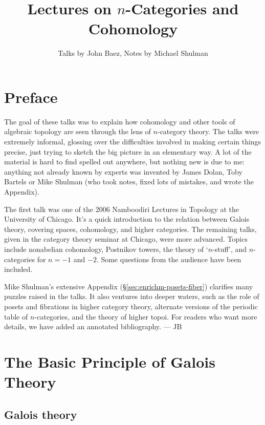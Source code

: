 \documentclass{amsart}
\title{Lectures on $n$-Categories and Cohomology}
\author{Talks by John Baez, Notes by Michael Shulman}
\begin{document}
\maketitle

\tableofcontents 

\eject

\section*{Preface}
\label{sec:preface}
The goal of these talks was to explain how cohomology and other
tools of algebraic topology are seen through the lens of 
$n$-category theory.  
The talks were extremely informal, glossing over the difficulties
involved in making certain things precise, just trying to sketch the
big picture in an elementary way.  A lot of the material is
hard to find spelled out anywhere, but nothing new is due to me:
anything not already known by experts was invented by James Dolan,
Toby Bartels or Mike Shulman (who took notes, fixed lots of mistakes,
and wrote the Appendix).

The first talk was one of the 2006 Namboodiri Lectures
in Topology at the University of Chicago.
It's a quick introduction to the relation 
between Galois theory, covering spaces, cohomology, and higher 
categories.  The remaining talks, given in the category theory 
seminar at Chicago, were more advanced.
Topics include nonabelian cohomology, Postnikov towers, the 
theory of `$n$-stuff', and $n$-categories for $n = -1$ and $-2$.
Some questions from the audience have been included.  

Mike Shulman's extensive Appendix (\S\ref{sec:enrichm-posets-fiber})
clarifies many puzzles raised in
the talks.  It also ventures into deeper waters, such as the role of posets
and fibrations in higher category theory, alternate versions of the 
periodic table of $n$-categories, and the theory of higher topoi.
For readers who want more details, we have added an annotated
bibliography. --- JB

\vfill
\eject

\section{The Basic Principle of Galois Theory}
\label{sec:basic-principle-galois}

\subsection{Galois theory}
\label{sec:galois-erlangen}
\end{document}
